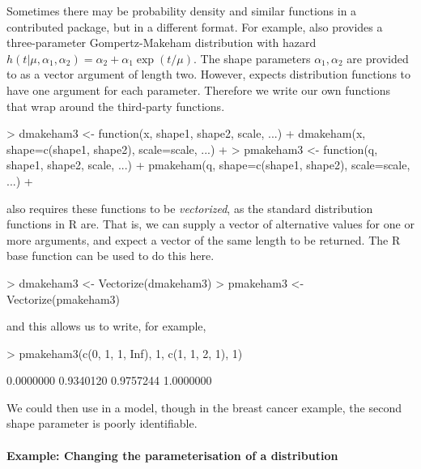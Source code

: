 \documentclass[nojss,nofooter]{jss}
\begin{document}
Sometimes there may be probability density and similar functions in a
contributed package, but in a different format.  For example,
 also provides a three-parameter Gompertz-Makeham
distribution with hazard $h(t|\mu,\alpha_1,\alpha_2)= \alpha_2 + \alpha_1 \exp(t/\mu)$.
The shape parameters $\alpha_1,\alpha_2$ are provided to 
 as a vector argument of length two.  However, 
expects distribution functions to have one argument for each
parameter.  Therefore we write our own functions that wrap around 
the third-party functions.
\begin{Schunk}
\begin{Sinput}
> dmakeham3 <- function(x, shape1, shape2, scale, ...)  {
+     dmakeham(x, shape=c(shape1, shape2), scale=scale, ...)
+ }
> pmakeham3 <- function(q, shape1, shape2, scale, ...)  {
+     pmakeham(q, shape=c(shape1, shape2), scale=scale, ...)
+ }
\end{Sinput}
\end{Schunk}
 also requires these functions to be
\emph{vectorized}, as the standard distribution functions in R are.
That is, we can supply a vector of alternative values for one or more
arguments, and expect a vector of the same length to be returned.  The
R base function  can be used to do this here.
\begin{Schunk}
\begin{Sinput}
> dmakeham3 <- Vectorize(dmakeham3) 
> pmakeham3 <- Vectorize(pmakeham3)
\end{Sinput}
\end{Schunk}
and this allows us to write, for example, 
\begin{Schunk}
\begin{Sinput}
> pmakeham3(c(0, 1, 1, Inf), 1, c(1, 1, 2, 1), 1)
\end{Sinput}
\begin{Soutput}
[1] 0.0000000 0.9340120 0.9757244 1.0000000
\end{Soutput}
\end{Schunk}
We could then use 
in a  model, though in the breast cancer example,
the second shape parameter is poorly identifiable.


\paragraph{Example: Changing the parameterisation of a distribution}
\end{document}
